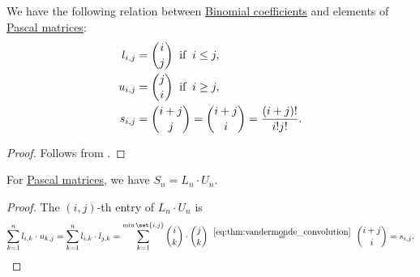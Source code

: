 \begin{proposition}\label{thm:pascal_matrix_binomial}
  We have the following relation between \hyperref[def:binomial_coefficient]{Binomial coefficients} and elements of \hyperref[def:pascal_matrix]{Pascal matrices}:
  \begin{align*}
    l_{i,j} &= \binom i j \thickspace\T{if}\thickspace i \leq j, \\
    u_{i,j} &= \binom j i \thickspace\T{if}\thickspace i \geq j, \\
    s_{i,j} &= \binom {i + j} j = \binom {i + j} i = \frac {(i + j)!} {i! j!}. \\
  \end{align*}
\end{proposition}
\begin{proof}
  Follows from .
\end{proof}

\begin{proposition}\label{thm:pascal_matrix_product}
  For \hyperref[def:pascal_matrix]{Pascal matrices}, we have \( S_n = L_n \cdot U_n \).
\end{proposition}
\begin{proof}
  The \( (i, j) \)-th entry of \( L_n \cdot U_n \) is
  \begin{equation*}
    \sum_{k=1}^n l_{i,k} \cdot u_{k,j}
    =
    \sum_{k=1}^n l_{i,k} \cdot l_{j,k}
    =
    \sum_{k=1}^{\min\set{ i, j }} \binom i k \cdot \binom j k
    \reloset {\eqref{eq:thm:vandermonde_convolution}} =
    \binom {i + j} i
    =
    s_{i,j}.
  \end{equation*}
\end{proof}
